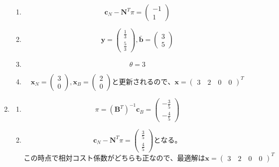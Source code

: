 \documentclass[a4paper,12pt]{jsarticle}
\begin{document}
\begin{enumerate}
\begin{enumerate}
          \item \[\bm{c}_N-\bm{N}^T\pi=
                  \begin{pmatrix}
                    -1 \\1
                  \end{pmatrix}\]
          \item \[\bm{y}=
                  \begin{pmatrix}
                    \frac{1}{3} \\\frac{5}{3}
                  \end{pmatrix}
                  ,\bar{\bm{b}}=
                  \begin{pmatrix}
                    3 \\5
                  \end{pmatrix}\]
          \item \[\theta =3\]
          \item \[\bm{x}_N=
                  \begin{pmatrix}
                    3 \\0
                  \end{pmatrix}
                  ,\bm{x}_B=
                  \begin{pmatrix}
                    2 \\0
                  \end{pmatrix}と更新されるので、
                  \bm{x}=
                  \begin{pmatrix}
                    3\quad 2\quad 0\quad 0
                  \end{pmatrix}^T\]
        \end{enumerate}
  \item
        \begin{enumerate}
          \item \[\pi =(\bm{B}^T)^{-1}\bm{c}_B=
                  \begin{pmatrix}
                    -\frac{3}{5} \\ -\frac{4}{5}
                  \end{pmatrix}\]
          \item \[\bm{c}_N-\bm{N}^T\pi=
                  \begin{pmatrix}
                    \frac{3}{5} \\ \frac{4}{5}
                  \end{pmatrix}となる。\]
                \[この時点で相対コスト係数がどちらも正なので、最適解は
                  \bm{x}=
                  \begin{pmatrix}
                    3\quad 2\quad 0\quad 0
                  \end{pmatrix}^T\]
        \end{enumerate}
\end{enumerate}
\end{document}

